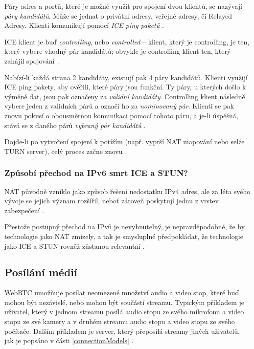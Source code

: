 Páry adres a portů, které je možné využít pro spojení dvou klientů, se nazývají
\textit{páry kandidátů}. Může se jednat o privátní adresy, veřejné adresy, či
Relayed Adresy. Klienti komunikují pomocí \textit{ICE ping paketů}
\cite{WebRTCForTheCurious}.

ICE klient je buď \textit{controlling}, nebo \textit{controlled} -- klient,
který je controlling, je ten, který vybere vhodný pár kandidátů; obvykle je
controlling klient ten, který zahájil spojování~\cite{WebRTCForTheCurious}.

Nabízí-li každá strana 2 kandidáty, existují pak 4 páry kandidátů. Klienti
využijí ICE ping pakety, aby ověřili, které páry jsou funkční. Ty páry, u
kterých došlo k výměně dat, jsou pak označeny za \textit{validní kandidáty}.
Controlling klient následně vybere jeden z validních párů a označí ho za
\textit{nominovaný pár}. Klienti se pak znovu pokusí o obousměrnou komunikaci
pomocí tohoto páru, a je-li úspěšná, stává se z daného párů \textit{vybraný pár
	kandidátů} \cite{WebRTCForTheCurious}.

Dojde-li po vytvoření spojení k potížím (např. vyprší NAT mapování nebo selže
TURN server), celý proces začne znovu \cite{WebRTCForTheCurious}.

\subsubsection{Způsobí přechod na IPv6 smrt ICE a STUN?}

NAT původně vzniklo jako způsob řešení nedostatku IPv4 adres, ale za léta svého
vývoje se jejich význam rozšířil, neboť zároveň poskytují jednu z vrstev
zabezpečení \cite{Quora-WillIPv6KillSTUNAndICE}.

Přestože postupný přechod na IPv6 je nevyhnutelný, je nepravděpodobné, že by
technologie jako NAT zmizely, a tak je smysluplné předpokládat, že technologie
jako ICE a STUN rovněž zůstanou relevantní \cite{Quora-WillIPv6KillSTUNAndICE}.

\subsection{Posílání médií}

WebRTC umožňuje posílat neomezené množství audio a video stop, které buď mohou
být nezávislé, nebo mohou být součástí streamu. Typickým příkladem je uživatel,
který v jednom streamu posílá audio stopu ze svého mikrofonu a video stopu ze
své kamery a v druhém streamu audio stopu a video stopu ze svého počítače.
Dalším příkladem je server, který přeposílá streamy jiných uživatelů, jak je
popsáno v části \ref{connectionModels} \cite{WebRTCForTheCurious}.

